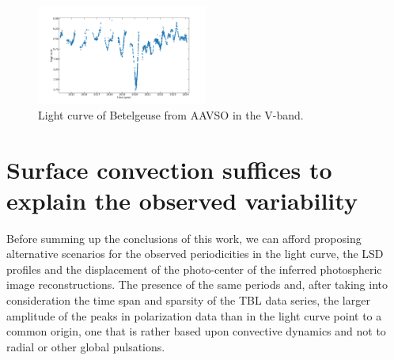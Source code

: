\documentclass{aa}
\begin{document}
\begin{figure}[!h]
    \centering
    \includegraphics[width=0.5\textwidth]{Light_curve_Betelgeuse.png}
    \caption{Light curve of Betelgeuse from AAVSO in the V-band.}
    \label{light curve Betelgeuse}
\end{figure}


\section{Surface convection suffices to explain the observed variability}

Before summing up the conclusions of this work, we can afford proposing alternative scenarios for the observed periodicities in the light curve, 
the LSD profiles and the displacement of the photo-center of the inferred photospheric image reconstructions. The presence of the same 
periods and, after taking into consideration the time span and sparsity of the TBL data series, the larger amplitude of the peaks in
polarization data  than in the light curve point to a common origin, one that is rather based upon convective dynamics and not to radial or 
other global pulsations.

\end{document}
